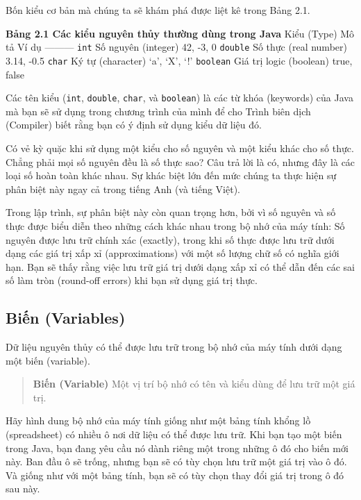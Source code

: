 Bốn kiểu cơ bản mà chúng ta sẽ khám phá được liệt kê trong Bảng 2.1.

\textbf{Bảng 2.1 Các kiểu nguyên thủy thường dùng trong Java} \textbar{}
Kiểu (Type) \textbar{} Mô tả \textbar{} Ví dụ \textbar{}
\textbar---\textbar---\textbar---\textbar{} \textbar{} \texttt{int}
\textbar{} Số nguyên (integer) \textbar{} 42, -3, 0 \textbar{}
\textbar{} \texttt{double} \textbar{} Số thực (real number) \textbar{}
3.14, -0.5 \textbar{} \textbar{} \texttt{char} \textbar{} Ký tự
(character) \textbar{} `a', `X', `!' \textbar{} \textbar{}
\texttt{boolean} \textbar{} Giá trị logic (boolean) \textbar{} true,
false \textbar{}

Các tên kiểu (\texttt{int}, \texttt{double}, \texttt{char}, và
\texttt{boolean}) là các từ khóa (keywords) của Java mà bạn sẽ sử dụng
trong chương trình của mình để cho Trình biên dịch (Compiler) biết rằng
bạn có ý định sử dụng kiểu dữ liệu đó.

Có vẻ kỳ quặc khi sử dụng một kiểu cho số nguyên và một kiểu khác cho số
thực. Chẳng phải mọi số nguyên đều là số thực sao? Câu trả lời là có,
nhưng đây là các loại số hoàn toàn khác nhau. Sự khác biệt lớn đến mức
chúng ta thực hiện sự phân biệt này ngay cả trong tiếng Anh (và tiếng
Việt).

Trong lập trình, sự phân biệt này còn quan trọng hơn, bởi vì số nguyên
và số thực được biểu diễn theo những cách khác nhau trong bộ nhớ của máy
tính: Số nguyên được lưu trữ chính xác (exactly), trong khi số thực được
lưu trữ dưới dạng các giá trị xấp xỉ (approximations) với một số lượng
chữ số có nghĩa giới hạn. Bạn sẽ thấy rằng việc lưu trữ giá trị dưới
dạng xấp xỉ có thể dẫn đến các sai số làm tròn (round-off errors) khi
bạn sử dụng giá trị thực.

\subsection{Biến (Variables)}\label{biux1ebfn-variables}

Dữ liệu nguyên thủy có thể được lưu trữ trong bộ nhớ của máy tính dưới
dạng một biến (variable).

\begin{quote}
\textbf{Biến (Variable)} Một vị trí bộ nhớ có tên và kiểu dùng để lưu
trữ một giá trị.
\end{quote}

Hãy hình dung bộ nhớ của máy tính giống như một bảng tính khổng lồ
(spreadsheet) có nhiều ô nơi dữ liệu có thể được lưu trữ. Khi bạn tạo
một biến trong Java, bạn đang yêu cầu nó dành riêng một trong những ô đó
cho biến mới này. Ban đầu ô sẽ trống, nhưng bạn sẽ có tùy chọn lưu trữ
một giá trị vào ô đó. Và giống như với một bảng tính, bạn sẽ có tùy chọn
thay đổi giá trị trong ô đó sau này.

